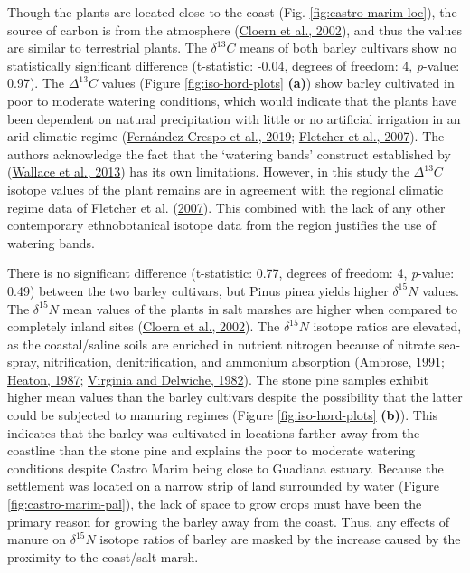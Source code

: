 \documentclass[preprint, 3p, authoryear]{elsarticle} %
\begin{document}
Though the plants are located close to the coast (Fig. \ref{fig:castro-marim-loc}), the source of carbon is from the atmosphere (\protect\hyperlink{ref-cloern_etal02}{Cloern et al., 2002}), and thus the values are similar to terrestrial plants. The \(\delta ^{13}C\) means of both barley cultivars show no statistically significant difference (t-statistic: -0.04, degrees of freedom: 4, \emph{p}-value: 0.97). The \(\Delta ^{13}C\) values (Figure \ref{fig:iso-hord-plots} \textbf{(a)}) show barley cultivated in poor to moderate watering conditions, which would indicate that the plants have been dependent on natural precipitation with little or no artificial irrigation in an arid climatic regime (\protect\hyperlink{ref-fernandez-crespo_etal19}{Fernández-Crespo et al., 2019}; \protect\hyperlink{ref-fletcher_etal07}{Fletcher et al., 2007}). The authors acknowledge the fact that the `watering bands' construct established by (\protect\hyperlink{ref-wallace_etal13}{Wallace et al., 2013}) has its own limitations. However, in this study the \(\Delta ^{13}C\) isotope values of the plant remains are in agreement with the regional climatic regime data of Fletcher et al. (\protect\hyperlink{ref-fletcher_etal07}{2007}). This combined with the lack of any other contemporary ethnobotanical isotope data from the region justifies the use of watering bands.

There is no significant difference (t-statistic: 0.77, degrees of freedom: 4, \emph{p}-value: 0.49) between the two barley cultivars, but Pinus pinea yields higher \(\delta ^{15}N\) values. The \(\delta ^{15}N\) mean values of the plants in salt marshes are higher when compared to completely inland sites (\protect\hyperlink{ref-cloern_etal02}{Cloern et al., 2002}). The \(\delta ^{15}N\) isotope ratios are elevated, as the coastal/saline soils are enriched in nutrient nitrogen because of nitrate sea-spray, nitrification, denitrification, and ammonium absorption (\protect\hyperlink{ref-ambrose91}{Ambrose, 1991}; \protect\hyperlink{ref-heaton87}{Heaton, 1987}; \protect\hyperlink{ref-virginia_delwiche82}{Virginia and Delwiche, 1982}). The stone pine samples exhibit higher mean values than the barley cultivars despite the possibility that the latter could be subjected to manuring regimes (Figure \ref{fig:iso-hord-plots} \textbf{(b)}). This indicates that the barley was cultivated in locations farther away from the coastline than the stone pine and explains the poor to moderate watering conditions despite Castro Marim being close to Guadiana estuary. Because the settlement was located on a narrow strip of land surrounded by water (Figure \ref{fig:castro-marim-pal}), the lack of space to grow crops must have been the primary reason for growing the barley away from the coast. Thus, any effects of manure on \(\delta ^{15}N\) isotope ratios of barley are masked by the increase caused by the proximity to the coast/salt marsh.
\end{document}
